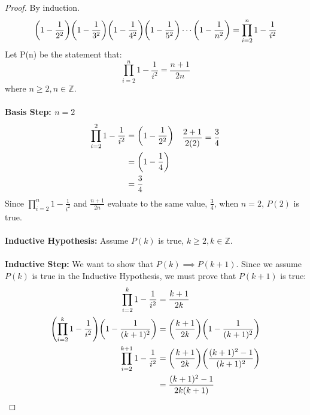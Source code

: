 \documentclass[article,12pt]{article}
\DeclarePairedDelimiter\paren{(}{)} %
\newcommand{\df}{\displaystyle\frac} %
\newcommand{\ints}{\mathbb{Z}}
\begin{document}
\begin{proof} By induction. \\
    \[ \paren*{1-\df1{2^2}}\paren*{1-\df1{3^2}}\paren*{1-\df1{4^2}}\paren*{1-\df1{5^2}}\cdots \paren*{1-\df1{n^2}} = \prod_{i=2}^{n}{1 - \frac{1}{i^2}} \]
    Let P(n) be the statement that:
    \[ \prod_{i=2}^{n}{1 - \frac{1}{i^2}} = \frac{n+1}{2n}\]
    where $n \geq 2, n \in \ints$. \\
    \\
    \textbf{Basis Step: $n=2$}
    \begin{align*}
        \begin{aligned}
            \prod_{i=2}^{2}{1-\frac{1}{i^2}} &= \paren*{1 - \frac{1}{2^2}} \\
                                         &= \paren*{1 - \frac{1}{4}} \\
                                         &= \frac{3}{4}
        \end{aligned}
        &&
        \begin{aligned}
            \frac{2+1}{2(2)} &= \frac{3}{4} \\
            \\
            \\
            \\
        \end{aligned}
    \end{align*}
    Since $\displaystyle\prod_{i=2}^{n}{1-\frac{1}{i^2}}$ and $\df{n+1}{2n}$ evaluate to the same value, $\df{3}{4}$, when $n=2$, $P(2)$ is true. \\
    \\
    \textbf{Inductive Hypothesis:} Assume $P(k)$ is true, $k \geq 2, k \in \ints$. \\
    \\
    \textbf{Inductive Step:} We want to show that $P(k) \implies P(k+1)$. Since we assume $P(k)$ is true in the Inductive Hypothesis, we must prove that $P(k+1)$ is true: 
    \begin{align*}
        \prod_{i=2}^{k}{1-\frac{1}{i^2}} &= \frac{k+1}{2k} \\
        \paren*{\prod_{i=2}^{k}{1-\frac{1}{i^2}}}\paren*{1-\frac{1}{(k+1)^2}} &= \paren*{\frac{k+1}{2k}}\paren*{1-\frac{1}{(k+1)^2}} \\
        \prod_{i=2}^{k+1}{1-\frac{1}{i^2}} &= \paren*{\frac{k+1}{2k}}\paren*{\frac{(k+1)^2 - 1}{(k+1)^2}} \\
                                           &= \frac{(k+1)^2 - 1}{2k(k+1)} \\

\end{align*}
\end{proof}
\end{document}
